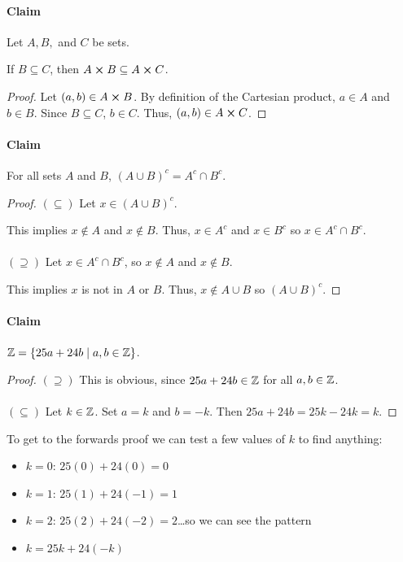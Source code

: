 \documentclass[../main.tex]{subfiles}
\begin{document}
\paragraph{Claim} Let $A, B,$ and $C$ be sets.

If $B \subseteq C$, then $A \cross B \subseteq A \cross C$.

\begin{proof}
    Let $(a, b) \in A \cross B$. By definition of the Cartesian product, $a \in A$ and $b \in B$.
    Since $B \subseteq C$, $b \in C$. Thus, $(a, b) \in A \cross C$.
\end{proof}

\paragraph{Claim} For all sets $A$ and $B$, $(A \cup B)^c = A^c \cap B^c$.

\begin{proof}
    $(\subseteq)$ Let $x \in (A \cup B)^c$. 

    This implies $x \notin A$ and $x \notin B$. Thus, $x \in A^c$ and $x \in B^c$ so
    $x \in A^c \cap B^c$.

    \paragraph{}
    $(\supseteq)$ Let $x \in A^c \cap B^c$, so $x \notin A$ and $x \notin B$.

    This implies $x$ is not in $A$ or $B$. Thus, $x \notin A \cup B$ so $(A \cup B)^c$.
\end{proof}

\paragraph{Claim} $\mathbb{Z} = \{25 a + 24b \mid a, b \in \mathbb{Z}\}$.

\begin{proof}
    $(\supseteq)$ This is obvious, since $25a +24b \in \mathbb{Z}$ for all $a, b \in \mathbb{Z}$.

    \paragraph{}
    $(\subseteq)$ Let $k \in \mathbb{Z}$. Set $a = k$ and $b = -k$. Then $25 a + 24b = 25k - 24k = k$.
\end{proof}

To get to the forwards proof we can test a few values of $k$ to find anything:
\begin{itemize}
    \item $k = 0$: $25(0) + 24(0) = 0$
    \item $k = 1$: $25(1) + 24(-1) = 1$
    \item $k = 2$: $25(2) + 24(-2) = 2$\dots so we can see the pattern
    \item $k = 25k + 24(-k)$
\end{itemize}
\end{document}
